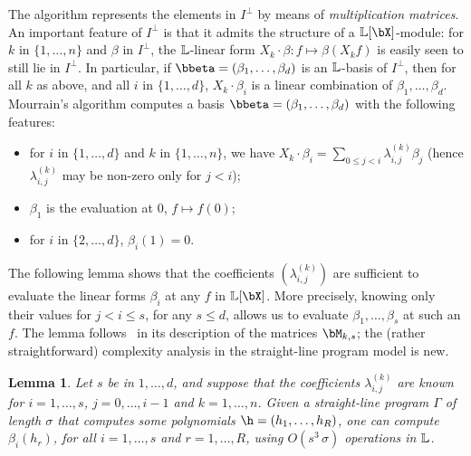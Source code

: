 \documentclass[12pt]{article}
\newtheorem{lemma}[definition]{Lemma}
\begin{document}
The algorithm represents the elements in $I^{\perp}$ by means of {\em
  multiplication matrices}. An important feature of $I^{\perp}$ is
that it admits the structure of a $\LL[\bX]$-module: for $k$ in
$\{1,\dots,n\}$ and $\beta$ in $I^{\perp}$, the $\mathbb{L}$-linear form $X_k
\cdot \beta: f \mapsto \beta(X_k f)$ is easily seen to still lie in
$I^{\perp}$.  In particular, if
$\bbeta=(\beta_1,\dots,\beta_d)$ is an $\mathbb{L}$-basis of
$I^{\perp}$, then for all $k$ as above, and all $i$ in
$\{1,\dots,d\}$, $X_k \cdot \beta_i$ is a linear combination of
$\beta_1,\dots,\beta_d$. Mourrain's algorithm computes a basis
$\bbeta=(\beta_1,\dots,\beta_d)$ with the following features:
\begin{itemize}
\item for $i$ in $\{1,\dots,d\}$ and $k$ in $\{1,\dots,n\}$, we have
  $X_k \cdot \beta_i=\sum_{0 \le j < i} \lambda^{(k)}_{i,j} \beta_j$
  (hence $\lambda^{(k)}_{i,j}$ may be non-zero 
  only for $j<i$);
\item $\beta_1$ is the evaluation at $0$, $f \mapsto f(0)$;
\item for $i$ in $\{2,\dots,d\}$, $\beta_i(1)=0$.
\end{itemize}
The following lemma shows that the coefficients $(\lambda^{(k)}_{i,j})$
are sufficient to evaluate  the linear forms $\beta_i$ at any $f$ in
$\LL[\bX]$. More precisely, knowing only their values for $j < i \le s$,
for any $s \le d$, allows us to evaluate $\beta_1,\dots,\beta_s$ at such an $f$.
The lemma follows~\cite{Mourrain97} in its description
of the matrices $\bM_{k,s}$; the (rather straightforward) complexity analysis 
in the straight-line program model is new.
\begin{lemma}\label{lemma:evalbeta}
   Let $s$ be in $1,\dots,d$, and suppose that the coefficients
  $\lambda^{(k)}_{i,j}$ are known for $i=1,\dots,s$, $j=0,\dots,i-1$
  and $k=1,\dots,n$. Given a straight-line program $\Gamma$ of length
  $\sigma$ that computes some polynomials $\h=(h_1,\dots,h_R)$, one can compute
  $\beta_i(h_r)$, for all $i=1,\dots,s$ and $r=1,\dots,R$, using
  $O(s^3\,\sigma)$ operations in $\mathbb{L}$.
\end{lemma}
\end{document}
